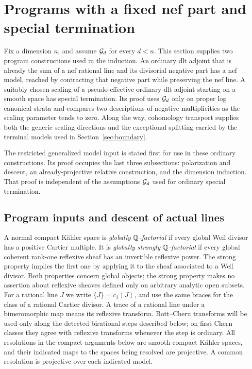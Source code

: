 \section{Programs with a fixed nef part and special termination}
\label{sec:programs}
\label{prog:section}

Fix a dimension \(n\), and assume \(\mathcal G_d\) for every \(d<n\).
This section supplies two program constructions used in the induction.
An ordinary dlt adjoint that is already the sum of a nef rational line and
its divisorial negative part has a nef model, reached by contracting that
negative part while preserving the nef line. A suitably chosen scaling of
a pseudo-effective ordinary dlt adjoint starting on a smooth space has
special termination. Its proof uses \(\mathcal G_d\) only on proper log
canonical strata and compares two descriptions of negative multiplicities
as the scaling parameter tends to zero. Along the way, cohomology transport
supplies both the generic scaling directions and the exceptional splitting
carried by the terminal models used in Section~\ref{sec:boundary}.

The restricted generalized model input is stated first for use in these
ordinary constructions. Its proof occupies the last three subsections:
polarization and descent, an already-projective relative construction,
and the dimension induction. That proof is independent of the assumptions
\(\mathcal G_d\) used for ordinary special termination.

\subsection{Program inputs and descent of actual lines}

A normal compact Kähler space is \emph{globally \(\mathbb Q\)-factorial} if
every global Weil divisor has a positive Cartier multiple. It is
\emph{globally strongly \(\mathbb Q\)-factorial} if every global coherent
rank-one reflexive sheaf has an invertible reflexive power. The strong
property implies the first one by applying it to the sheaf associated to a
Weil divisor. Both properties concern global objects; the strong property
makes no assertion about reflexive sheaves defined only on arbitrary
analytic open subsets. For a rational line \(J\) we write
\(\{J\}=c_1(J)\), and use the same braces for the class of a rational
Cartier divisor.  A trace of a rational line under a bimeromorphic map
means its reflexive transform. Bott--Chern transforms will be used only
along the detected birational steps described below; on first Chern classes they
agree with reflexive transforms whenever the step is ordinary.
All resolutions in the compact arguments below are smooth compact
Kähler spaces, and their indicated maps to the spaces being resolved
are projective.  A common resolution is projective over each
indicated model.

